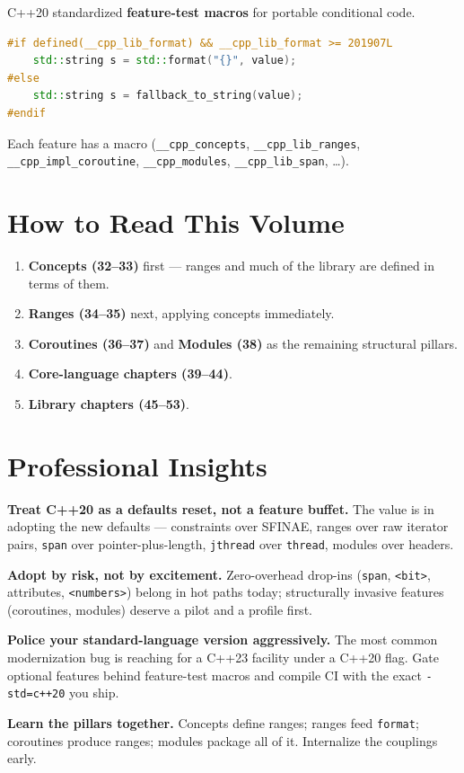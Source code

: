 C++20 standardized \textbf{feature-test macros} for portable conditional code.

\begin{lstlisting}[language=C++,caption={Gating on a standardized feature-test macro}]
#if defined(__cpp_lib_format) && __cpp_lib_format >= 201907L
    std::string s = std::format("{}", value);
#else
    std::string s = fallback_to_string(value);
#endif
\end{lstlisting}

Each feature has a macro (\texttt{\_\_cpp\_concepts}, \texttt{\_\_cpp\_lib\_ranges}, \texttt{\_\_cpp\_impl\_coroutine}, \texttt{\_\_cpp\_modules}, \texttt{\_\_cpp\_lib\_span}, \dots).

\section{How to Read This Volume}
\label{sec:c20-how-to-read}

\begin{enumerate}
\item \textbf{Concepts (32--33)} first --- ranges and much of the library are defined in terms of them.
\item \textbf{Ranges (34--35)} next, applying concepts immediately.
\item \textbf{Coroutines (36--37)} and \textbf{Modules (38)} as the remaining structural pillars.
\item \textbf{Core-language chapters (39--44)}.
\item \textbf{Library chapters (45--53)}.
\end{enumerate}

\section{Professional Insights}
\label{sec:c20-map-insights}

\textbf{Treat C++20 as a defaults reset, not a feature buffet.} The value is in adopting the new defaults --- constraints over SFINAE, ranges over raw iterator pairs, \texttt{span} over pointer-plus-length, \texttt{jthread} over \texttt{thread}, modules over headers.

\textbf{Adopt by risk, not by excitement.} Zero-overhead drop-ins (\texttt{span}, \texttt{<bit>}, attributes, \texttt{<numbers>}) belong in hot paths today; structurally invasive features (coroutines, modules) deserve a pilot and a profile first.

\textbf{Police your standard-language version aggressively.} The most common modernization bug is reaching for a C++23 facility under a C++20 flag. Gate optional features behind feature-test macros and compile CI with the exact \texttt{-std=c++20} you ship.

\textbf{Learn the pillars together.} Concepts define ranges; ranges feed \texttt{format}; coroutines produce ranges; modules package all of it. Internalize the couplings early.
